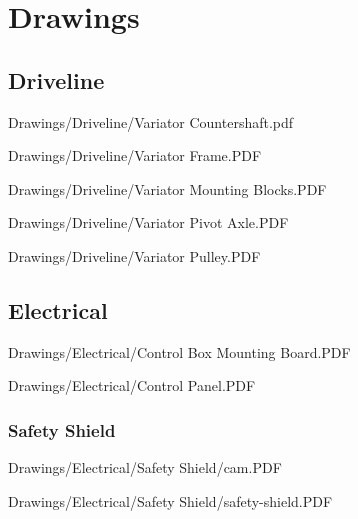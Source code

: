 \chapter{Drawings}

\section{Driveline}


{Drawings/Driveline/Variator Countershaft.pdf}


{Drawings/Driveline/Variator Frame.PDF}


{Drawings/Driveline/Variator Mounting Blocks.PDF}


{Drawings/Driveline/Variator Pivot Axle.PDF}


{Drawings/Driveline/Variator Pulley.PDF}

\section{Electrical}


{Drawings/Electrical/Control Box Mounting Board.PDF}


{Drawings/Electrical/Control Panel.PDF}

\subsection{Safety Shield}


{Drawings/Electrical/Safety Shield/cam.PDF}


{Drawings/Electrical/Safety Shield/safety-shield.PDF}

